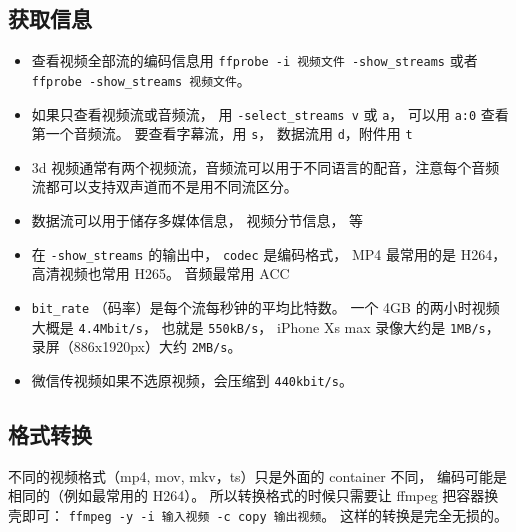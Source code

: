 
\begin{issues}
\issueDraft
\end{issues}

\subsection{获取信息}
\begin{itemize}
\item 查看视频全部流的编码信息用 \verb|ffprobe -i 视频文件 -show_streams| 或者 \verb|ffprobe -show_streams 视频文件|。
\item 如果只查看视频流或音频流， 用 \verb|-select_streams v| 或 \verb|a|， 可以用 \verb|a:0| 查看第一个音频流。 要查看字幕流，用 \verb|s|， 数据流用 \verb|d|，附件用 \verb|t|
\item 3d 视频通常有两个视频流，音频流可以用于不同语言的配音，注意每个音频流都可以支持双声道而不是用不同流区分。
\item 数据流可以用于储存多媒体信息， 视频分节信息， 等
\item 在 \verb|-show_streams| 的输出中， \verb|codec| 是编码格式， MP4 最常用的是 H264， 高清视频也常用 H265。 音频最常用 ACC
\item \verb|bit_rate| （码率）是每个流每秒钟的平均比特数。 一个 4GB 的两小时视频大概是 \verb|4.4Mbit/s|， 也就是 \verb|550kB/s|， iPhone Xs max 录像大约是 \verb|1MB/s|， 录屏（886x1920px）大约 \verb|2MB/s|。
\item 微信传视频如果不选原视频，会压缩到 \verb|440kbit/s|。
\end{itemize}

\subsection{格式转换}
不同的视频格式（mp4, mov, mkv，ts）只是外面的 container 不同， 编码可能是相同的（例如最常用的 H264）。 所以转换格式的时候只需要让 ffmpeg 把容器换壳即可： \verb|ffmpeg -y -i 输入视频 -c copy 输出视频|。 这样的转换是完全无损的。

